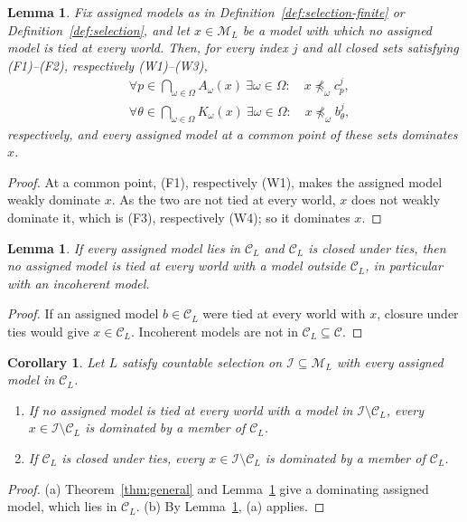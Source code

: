 \documentclass[11pt]{article}
\newtheorem{lemma}[theorem]{Lemma}
\newtheorem{corollary}[theorem]{Corollary}
\theoremstyle{definition}
\theoremstyle{remark}
\newcommand{\M}{\mathcal M}
\newcommand{\C}{\mathcal C}
\newcommand{\I}{\mathcal I}
\begin{document}
\begingroup\color{red}
\begin{lemma}\label{lem:no-tie}
Fix assigned models as in Definition~\ref{def:selection-finite} or Definition~\ref{def:selection}, and let $x\in\M_L$ be a model with which no assigned model is tied at every world. Then, for every index $j$ and all closed sets satisfying (F1)--(F2), respectively (W1)--(W3),
\begin{align}
&\forall p\in\bigcap_{\omega\in\Omega}A_\omega(x)\ \exists\omega\in\Omega:\quad x\not\preceq_\omega c^j_p,\tag{F3}\label{eq:f-notie}\\
&\forall\theta\in\bigcap_{\omega\in\Omega}K_\omega(x)\ \exists\omega\in\Omega:\quad x\not\preceq_\omega b^j_\theta,\tag{W4}\label{eq:notie}
\end{align}
respectively, and every assigned model at a common point of these sets dominates $x$.
\end{lemma}
\begin{proof}
At a common point, (F1), respectively (W1), makes the assigned model weakly dominate $x$. As the two are not tied at every world, $x$ does not weakly dominate it, which is (F3), respectively (W4); so it dominates $x$.
\end{proof}

\begin{lemma}\label{lem:tie-sufficient}
If every assigned model lies in $\C_L$ and $\C_L$ is closed under ties, then no assigned model is tied at every world with a model outside $\C_L$, in particular with an incoherent model.
\end{lemma}
\begin{proof}
If an assigned model $b\in\C_L$ were tied at every world with $x$, closure under ties would give $x\in\C_L$. Incoherent models are not in $\C_L\subseteq\C$.
\end{proof}

\begin{corollary}\label{cor:coherent-assigned}
Let $L$ satisfy countable selection on $\I\subseteq\M_L$ with every assigned model in $\C_L$.
\begin{enumerate}[label=(\alph*)]
\item If no assigned model is tied at every world with a model in $\I\setminus\C_L$, every $x\in\I\setminus\C_L$ is dominated by a member of $\C_L$.
\item If $\C_L$ is closed under ties, every $x\in\I\setminus\C_L$ is dominated by a member of $\C_L$.
\end{enumerate}
\end{corollary}
\begin{proof}
(a) Theorem~\ref{thm:general} and Lemma~\ref{lem:no-tie} give a dominating assigned model, which lies in $\C_L$. (b) By Lemma~\ref{lem:tie-sufficient}, (a) applies.
\end{proof}
\endgroup
\end{document}
